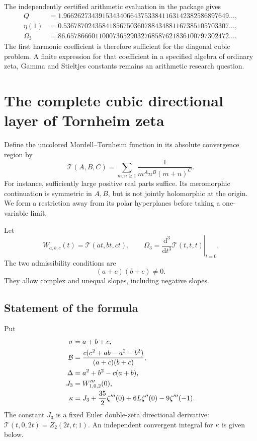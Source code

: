 \documentclass[11pt]{article}
\numberwithin{equation}{section}
\theoremstyle{definition}
\theoremstyle{remark}
\newcommand{\T}{\mathcal T}
\begin{document}
The independently certified arithmetic evaluation in the package gives
\begin{align*}
 Q&=1.96626273439153434066437533841163142382586897649\ldots,\\
 \eta(1)&=0.53678702435841856750360788434881167385105703307\ldots,\\
 \Omega_3&=86.6578666011000736529032768587621836100797302472\ldots.
\end{align*}
The first harmonic coefficient is therefore sufficient for the
diagonal cubic problem. A finite expression for that coefficient in
a specified algebra of ordinary zeta, Gamma and Stieltjes constants
remains an arithmetic research question.


\section{The complete cubic directional layer of Tornheim zeta}
\label{sec:rays}

Define the uncolored Mordell--Tornheim function in its absolute
convergence region by
\begin{equation}\label{ray:T}
 \T(A,B,C)=\sum_{m,n\ge1}\frac1{m^A n^B(m+n)^C}.
\end{equation}
For instance, sufficiently large positive real parts suffice.
Its meromorphic continuation is symmetric in $A,B$, but is not
jointly holomorphic at the origin. We form a restriction away from
its polar hyperplanes before taking a one-variable limit.

Let
\[
 W_{a,b,c}(t)=\T(at,bt,ct),\qquad
 \Omega_3=\left.\frac{\mathrm d^3}{\mathrm dt^3}\T(t,t,t)\right|_{t=0}.
\]
The two admissibility conditions are
\begin{equation}\label{ray:admissible}
 (a+c)(b+c)\ne0.
\end{equation}
They allow complex and unequal slopes, including negative slopes.

\subsection{Statement of the formula}

Put
\begin{align}
 \sigma&=a+b+c,\notag\\
 \mathcal B&=\frac{c(c^2+ab-a^2-b^2)}{(a+c)(b+c)},\label{ray:B}\\
 \Delta&=a^2+b^2-c(a+b),\notag\\
 J_3&=W_{1,0,2}'''(0),\notag\\
 \kappa&=J_3+\frac{35}{2}\zeta'''(0)
                 +6L\zeta''(0)-9\zeta'''(-1).\label{ray:kappa}
\end{align}
The constant $J_3$ is a fixed Euler double-zeta directional derivative:
$\T(t,0,2t)=Z_2(2t,t;1)$. An independent convergent integral for
$\kappa$ is given below.
\end{document}
